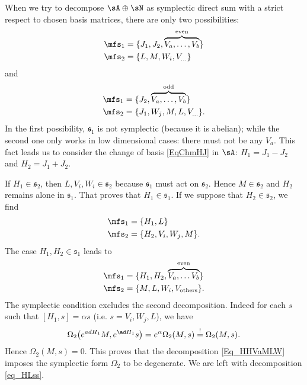 When we try to decompose $\sA\oplus\sN$ as symplectic direct sum with a strict respect to chosen basis matrices, there are only two possibilities:
\begin{equation}
	\begin{split}
		\mfs_1&=\{ J_1,J_2,\overbrace{V_a,\ldots,V_b}^{\text{even}}  \}\\
		\mfs_2&=\{ L,M,W_i,V_{\ldots}  \}
	\end{split}
\end{equation}
and
\begin{equation}
	\begin{split}
		\mfs_1&=\{ J_2,\overbrace{V_a,\ldots,V_b}^{\text{odd}}  \}\\
		\mfs_2&=\{ J_1,W_j,M,L,V_{\ldots}  \}  .
	\end{split}
\end{equation}
In the first possibility, $\mathfrak{s}_{1}$ is not symplectic (because it is abelian); while the second one only works in low dimensional cases: there must not be any $V_a$. This fact leads us to consider  the change of basis \eqref{EqChmHJ} in $\sA$: $H_1=J_1-J_2$ and $H_2=J_1+J_2$.

If $H_1\in\mathfrak{s}_2$, then $L,V_i,W_i\in\mathfrak{s}_2$ because $\mathfrak{s}_1$ must act on $\mathfrak{s}_2$. Hence $M\in\mathfrak{s}_2$ and $H_2$ remains alone in $\mathfrak{s}_1$. That proves that $H_1\in\mathfrak{s}_1$. If we suppose that $H_2\in\mathfrak{s}_2$, we find
\begin{equation}  \label{eq_HLss}
	\begin{split}
		\mfs_1&=\{ H_1,L  \}\\
		\mfs_2&=\{ H_2,V_i,W_j,M  \}.
	\end{split}
\end{equation}
The case $H_1,H_2\in\mathfrak{s}_1$ leads to
\begin{equation}   \label{Eq_HHVaMLW}
	\begin{split}
		\mfs_1&=\{ H_1,H_2,\overbrace{V_a,\ldots V_b}^{\text{even}}  \}\\
		\mfs_2&=\{ M,L,W_i,V_{\text{others}}  \}.
	\end{split}
\end{equation}
The symplectic condition excludes the second decomposition. Indeed for each $s$ such that $[H_1,s]=\alpha s$ (i.e. $s=V_i,W_j,L$), we have
\[
	\Omega_2\big(  e^{ad H_1}M, e^{\ad H_1}s \big)= e^{\alpha}\Omega_2(M,s)\stackrel{!}{=}\Omega_2(M,s).
\]
Hence $\Omega_2(M,s)=0$. This proves that the decomposition \eqref{Eq_HHVaMLW} imposes the symplectic form $\Omega_2$ to be degenerate. We are left with decomposition \eqref{eq_HLss}.

